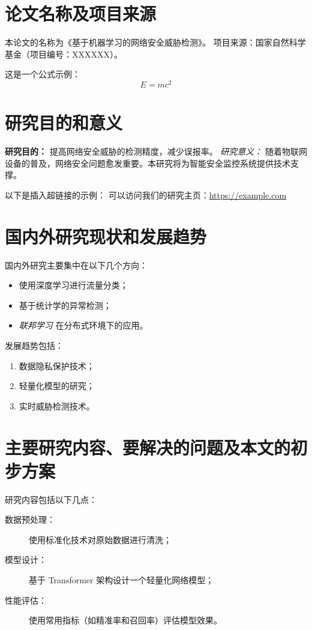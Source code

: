 \documentclass{xduugtp}
\begin{document}
\section{论文名称及项目来源}
本论文的名称为《基于机器学习的网络安全威胁检测》。  
项目来源：国家自然科学基金（项目编号：XXXXXX）。  

这是一个公式示例：
\[
E = mc^2
\]

\section{研究目的和意义}
\textbf{研究目的：} 提高网络安全威胁的检测精度，减少误报率。  
\textit{研究意义：} 随着物联网设备的普及，网络安全问题愈发重要。本研究将为智能安全监控系统提供技术支撑。

以下是插入超链接的示例：  
可以访问我们的研究主页：\url{https://example.com}

\section{国内外研究现状和发展趋势}
国内外研究主要集中在以下几个方向：
\begin{itemize}
    \item 使用深度学习进行流量分类；
    \item 基于统计学的异常检测；
    \item \textit{联邦学习} 在分布式环境下的应用\cite{wang2020flow}。
\end{itemize}

发展趋势包括：
\begin{enumerate}[label=(\arabic*)]
    \item 数据隐私保护技术；
    \item 轻量化模型的研究；
    \item 实时威胁检测技术\cite{yang2019federated}。
\end{enumerate}

\printbibliography

\section{主要研究内容、要解决的问题及本文的初步方案}
研究内容包括以下几点：
\begin{description}
    \item[数据预处理：] 使用标准化技术对原始数据进行清洗；
    \item[模型设计：] 基于 Transformer 架构设计一个轻量化网络模型；
    \item[性能评估：] 使用常用指标（如精准率和召回率）评估模型效果。
\end{description}
\end{document}

